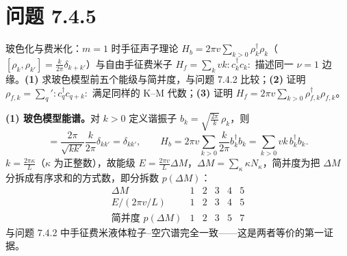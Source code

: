 \section*{问题 7.4.5}
\begin{problem}
玻色化与费米化：$m=1$ 时手征声子理论 $H_b=2\pi v\sum_{k>0}\rho_k^{\dagger}\rho_k$（$[\rho_k,\rho_{k'}]=\frac{k}{2\pi}\delta_{k+k'}$）与自由手征费米子 $H_f=\sum_k vk\!:\!c_k^{\dagger}c_k\!:$ 描述同一 $\nu=1$ 边缘。\textbf{(1)} 求玻色模型前五个能级与简并度，与问题 7.4.2 比较；\textbf{(2)} 证明 $\rho_{f,k}=\sum_q\!'\!:\!c_q^{\dagger}c_{q+k}\!:$ 满足同样的 K--M 代数；\textbf{(3)} 证明 $H_f=2\pi v\sum_{k>0}\rho_{f,k}^{\dagger}\rho_{f,k}$。
\end{problem}
\solution
\textbf{(1) 玻色模型能谱。}对 $k>0$ 定义谐振子 $b_k=\sqrt{\frac{2\pi}{k}}\,\rho_k$，则
\begin{equation*}
[b_k,b_{k'}^{\dagger}]=\frac{2\pi}{\sqrt{kk'}}\frac{k}{2\pi}\delta_{kk'}=\delta_{kk'},
\qquad
H_b=2\pi v\sum_{k>0}\frac{k}{2\pi}b_k^{\dagger}b_k=\sum_{k>0}vk\,b_k^{\dagger}b_k .
\end{equation*}
$k=\frac{2\pi\kappa}{L}$（$\kappa$ 为正整数），故能级 $E=\frac{2\pi v}{L}\Delta M$，$\Delta M=\sum_\kappa\kappa N_\kappa$，简并度为把 $\Delta M$ 分拆成有序求和的方式数，即分拆数 $p(\Delta M)$：
\begin{equation*}
\begin{array}{c|ccccc}
\Delta M & 1 & 2 & 3 & 4 & 5\\ \hline
E/(2\pi v/L) & 1 & 2 & 3 & 4 & 5\\
\text{简并度 }p(\Delta M) & 1 & 2 & 3 & 5 & 7
\end{array}
\end{equation*}
与问题 7.4.2 中手征费米液体粒子--空穴谱完全一致——这是两者等价的第一证据。

